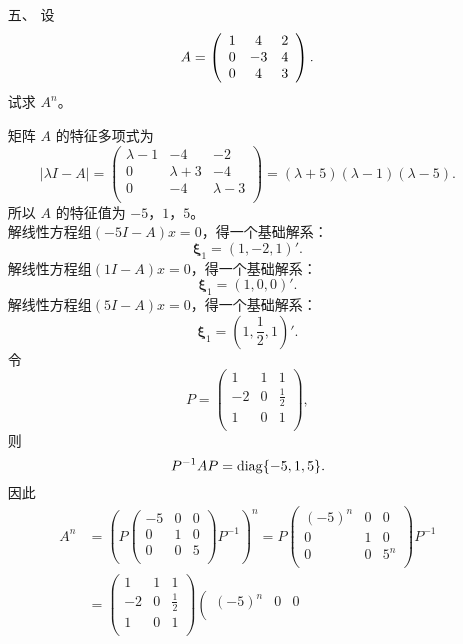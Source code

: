 \begin{enumerate}[1~]
\item[五、]
设\[
A = \left( \begin{array} { c c c } { 1 } & { 4 } & { 2 } \\ { 0 } & { - 3 } & { 4 } \\ { 0 } & { 4 } & { 3 } \end{array} \right).
\]
试求 $A^n$。
\begin{solution}
矩阵 $A$ 的特征多项式为\[
|\lambda I-A|=\left(
\begin{array}{ccc}
 \lambda-1 & -4 & -2 \\
 0 & \lambda+3 & -4 \\
 0 & -4 & \lambda-3 \\
\end{array}
\right) = (\lambda+5) (\lambda-1) (\lambda-5).
\]
所以 $A$ 的特征值为 $-5$，$1$，$5$。\\
解线性方程组$(-5I-A)x=0$，得一个基础解系：\[
\boldsymbol{\xi}_1=(1, -2, 1)'.
\]
解线性方程组$(1I-A)x=0$，得一个基础解系：\[
\boldsymbol{\xi}_1=(1, 0, 0)'.
\]
解线性方程组$(5I-A)x=0$，得一个基础解系：\[
\boldsymbol{\xi}_1=\left(1, \frac12, 1\right)'.
\]
令\[
P=\left( \begin{matrix}
	1&		1&		1\\
	-2&		0&		\frac{1}{2}\\
	1&		0&		1\\
\end{matrix} \right) ,
\]
则\[
P^{-1}AP={\rm diag}\{-5, 1, 5\}.
\]
因此\begin{align*}
A^n&=\left( P\left( \begin{matrix}
	-5&		0&		0\\
	0&		1&		0\\
	0&		0&		5\\
\end{matrix} \right) P^{-1}\right)^n=P\left( \begin{matrix}
	(-5)^n&		0&		0\\
	0&		1&		0\\
	0&		0&		5^n\\
\end{matrix} \right) P^{-1}\\
&=\left( \begin{matrix}
	1&		1&		1\\
	-2&		0&		\frac{1}{2}\\
	1&		0&		1\\
\end{matrix} \right)
\left( \begin{matrix}
	(-5)^n&		0&		0\\

\end{matrix}
\end{align*}
\end{solution}
\end{enumerate}
